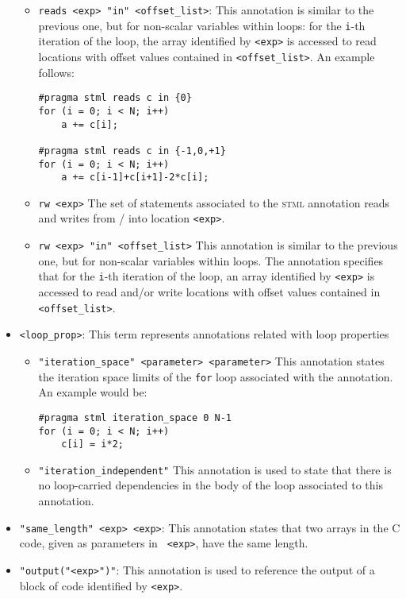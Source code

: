 \documentclass[svgnames,usenames,preprint,nocopyrightspace]{sigplanconf}
\newcommand{\stml}{\textsc{stml}\xspace}
\begin{document}
\begin{itemize}
\begin{itemize}
\item{\lstinline{reads <exp> "in" <offset_list>}}: This annotation is
  similar to the previous one, but for non-scalar variables within
  loops: for the
  \texttt{i}-th iteration of the loop, the array identified by
  \lstinline{<exp>} is accessed to read locations with offset values
  contained in \lstinline{<offset_list>}. An example follows: 

\noindent
\begin{minipage}{\linewidth}
\begin{lstlisting}[style=cstyle]
#pragma stml reads c in {0}
for (i = 0; i < N; i++)
    a += c[i];
    
#pragma stml reads c in {-1,0,+1}
for (i = 0; i < N; i++)
    a += c[i-1]+c[i+1]-2*c[i];    
\end{lstlisting}
\end{minipage}

\item{\lstinline{rw <exp>}} The set of statements associated to the
  \stml annotation reads and writes from / into location
  \lstinline{<exp>}.
\item{\lstinline{rw <exp> "in" <offset_list>}} This annotation is
  similar to the previous one, but for non-scalar variables within
  loops.  The annotation specifies that for the
  \texttt{i}-th iteration of the loop, an array identified by
  \lstinline{<exp>} is accessed to read and/or write locations with
  offset values contained in \lstinline{<offset_list>}. 
\end{itemize}
 
\item{\lstinline{<loop_prop>}}: This term represents annotations
  related with loop properties 
 \begin{itemize}
 \item{\lstinline{"iteration_space" <parameter> <parameter>}} This
   annotation states the iteration space limits of the \texttt{for} loop
   associated with the annotation. An example would be:

\noindent
\begin{minipage}{\linewidth}
\begin{lstlisting}[style=cstyle]
#pragma stml iteration_space 0 N-1
for (i = 0; i < N; i++)
    c[i] = i*2;
\end{lstlisting}
\end{minipage}

\item{\lstinline{"iteration_independent"}} This annotation is used to state that there is no loop-carried dependencies in the body of the loop associated to this annotation.
\end{itemize}

\item{\lstinline{"same_length" <exp> <exp>}:} This annotation states that two arrays in the C code, given as parameters in \lstinline{ <exp>}, have the same length.

\item{\lstinline{"output("<exp>")"}:} This annotation is used to reference the output of a block of code identified by \lstinline{<exp>}.

\end{itemize}
\end{document}
